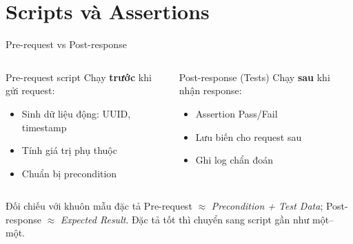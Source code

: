 \documentclass[aspectratio=169,12pt]{beamer}
\begin{document}
\section{Scripts và Assertions}

\begin{frame}{Pre-request vs Post-response}
  \begin{columns}[T]
    \begin{block}{Pre-request script}
      Chạy \textbf{trước} khi gửi request:
      \begin{itemize}
        \item Sinh dữ liệu động: UUID, timestamp
        \item Tính giá trị phụ thuộc
        \item Chuẩn bị precondition
      \end{itemize}
    \end{block}

    \begin{block}{Post-response (Tests)}
      Chạy \textbf{sau} khi nhận response:
      \begin{itemize}
        \item Assertion Pass/Fail
        \item Lưu biến cho request sau
        \item Ghi log chẩn đoán
      \end{itemize}
    \end{block}
  \end{columns}

  \vspace{0.3em}
  \begin{exampleblock}{Đối chiếu với khuôn mẫu đặc tả}
    Pre-request $\approx$ \emph{Precondition + Test Data};
    Post-response $\approx$ \emph{Expected Result}. Đặc tả tốt thì
    chuyển sang script gần như một--một.
  \end{exampleblock}
\end{frame}
\end{document}
